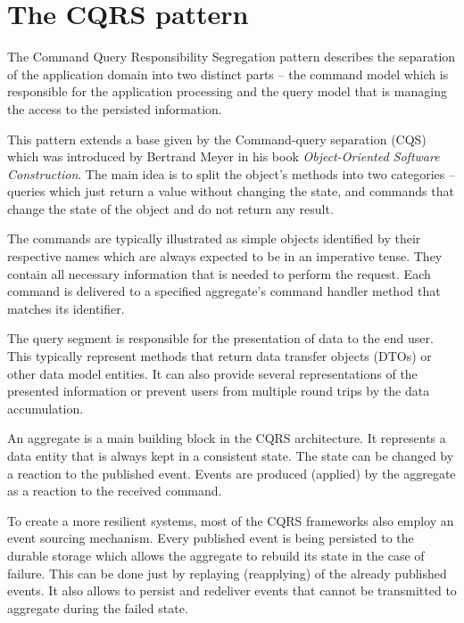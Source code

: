 \documentclass[oneside,
  digital, %
  table,   %
  nolof,     %
  nolot,     %
]{fithesis3}
\begin{document}
\makeatletter\thesis@blocks@clear\makeatother
{} %
\printindex




\appendix %

\chapter{The CQRS pattern}
\label{sec:appendix-cqrs}

The Command Query Responsibility Segregation pattern describes the separation of the application domain into two distinct parts -- the command model which is responsible for the application processing and the query model that is managing the access to the persisted information. 

This pattern extends a base given by the Command-query separation (CQS) which was introduced by Bertrand Meyer in his book \textit{Object-Oriented Software Construction}. The main idea is to split the object's methods into two categories -- queries which just return a value without changing the state, and commands that change the state of the object and do not return any result.

The commands are typically illustrated as simple objects identified by their respective names which are always expected to be in an imperative tense. They contain all necessary information that is needed to perform the request. Each command is delivered to a specified aggregate's command handler method that matches its identifier. 

The query segment is responsible for the presentation of data to the end user. This typically represent methods that return data transfer objects (DTOs) or other data model entities. It can also provide several representations of the presented information or prevent users from multiple round trips by the data accumulation.

An aggregate is a main building block in the CQRS architecture. It represents a data entity that is always kept in a consistent state. The state can be changed by a reaction to the published event. Events are produced (applied) by the aggregate as a reaction to the received command. 

To create a more resilient systems, most of the CQRS frameworks also employ an event sourcing mechanism. Every published event is being persisted to the durable storage which allows the aggregate to rebuild its state in the case of failure. This can be done just by replaying (reapplying) of the already published events. It also allows to persist and redeliver events that cannot be transmitted to aggregate during the failed state.
\end{document}
